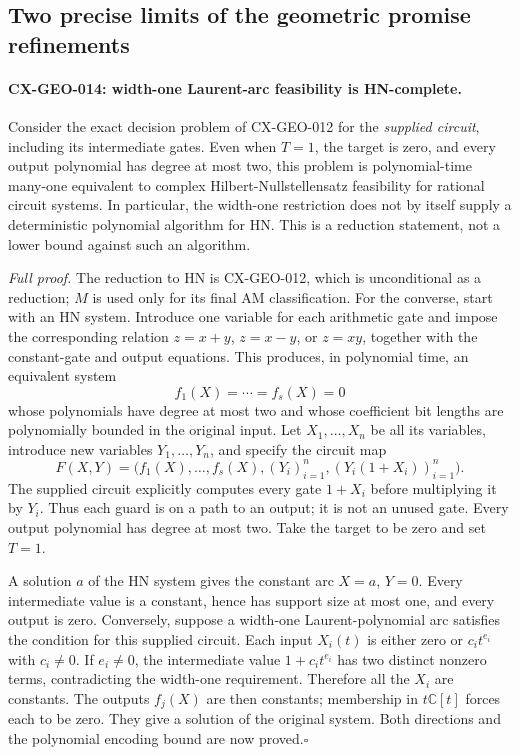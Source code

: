 \documentclass[11pt,a4paper]{article}
\begin{document}
\subsection{Two precise limits of the geometric promise refinements}

\paragraph{CX-GEO-014: width-one Laurent-arc feasibility is HN-complete.}
Consider the exact decision problem of CX-GEO-012 for the
\emph{supplied circuit}, including its intermediate gates. Even
when $T=1$, the target is zero, and every output polynomial has
degree at most two, this problem is polynomial-time many-one
equivalent to complex Hilbert-Nullstellensatz feasibility for
rational circuit systems. In particular, the width-one restriction
does not by itself supply a deterministic polynomial algorithm
for HN. This is a reduction statement, not a lower bound against
such an algorithm.

\emph{Full proof.}
The reduction to HN is CX-GEO-012, which is unconditional as a
reduction; $M$ is used only for its final AM classification. For
the converse, start with an HN system. Introduce one variable for
each arithmetic gate and impose the corresponding relation
$z=x+y$, $z=x-y$, or $z=xy$, together with the constant-gate
and output equations. This produces, in polynomial time, an
equivalent system
\[
                    f_1(X)=\cdots=f_s(X)=0
\]
whose polynomials have degree at most two and whose coefficient
bit lengths are polynomially bounded in the original input. Let
$X_1,\ldots,X_n$ be all its variables, introduce new variables
$Y_1,\ldots,Y_n$, and specify the circuit map
\[
 F(X,Y)=\bigl(f_1(X),\ldots,f_s(X),
            (Y_i)_{i=1}^n,(Y_i(1+X_i))_{i=1}^n\bigr).
 \tag{CX-width-one-guard}
\]
The supplied circuit explicitly computes every gate $1+X_i$
before multiplying it by $Y_i$. Thus each guard is on a path to
an output; it is not an unused gate. Every output polynomial has
degree at most two. Take the target to be zero and set $T=1$.

A solution $a$ of the HN system gives the constant arc
$X=a$, $Y=0$. Every intermediate value is a constant, hence
has support size at most one, and every output is zero. Conversely,
suppose a width-one Laurent-polynomial arc satisfies the condition
for this supplied circuit. Each input $X_i(t)$ is either zero or
$c_it^{e_i}$ with $c_i\ne0$. If $e_i\ne0$, the intermediate
value $1+c_it^{e_i}$ has two distinct nonzero terms, contradicting
the width-one requirement. Therefore all the $X_i$ are constants.
The outputs $f_j(X)$ are then constants; membership in
$t\mathbb C[t]$ forces each to be zero. They give a solution of
the original system. Both directions and the polynomial encoding
bound are now proved.\hfill$\square$
\end{document}
